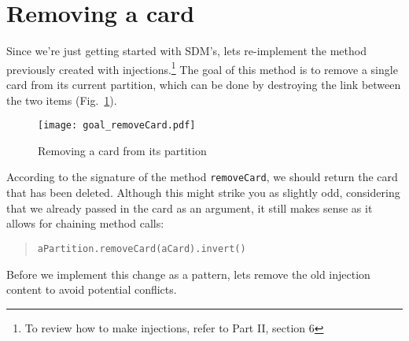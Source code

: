 \newpage
\genHeader
\section{Removing a card}
\hypertarget{sec:remCard}{}

Since we're just getting started with SDM's, lets re-implement the method previously created with injections.\footnote{To review how to make
injections, refer to Part II, section 6} The goal of this method is to remove a single card from its current
partition, which can be done by destroying the link between the two items (Fig.~\ref{fig:goal_removeCard}).
\vspace{0.5cm}

\begin{figure}[htbp]
	\centering
    \texttt{[image: goal\_removeCard.pdf]}
	\caption{Removing a card from its partition}
	\label{fig:goal_removeCard}
\end{figure}
\FloatBarrier

\vspace{0.5cm}

According to the signature of the method \texttt{removeCard}, we should return the card that has been deleted. Although this might strike you as slightly odd,
considering that we already passed in the card as an argument, it still makes sense as it allows for chaining method calls:
\begin{quote}\texttt{aPartition.removeCard(aCard).invert()}\end{quote}

Before we implement this change as a pattern, lets remove the old injection content to avoid potential conflicts.

